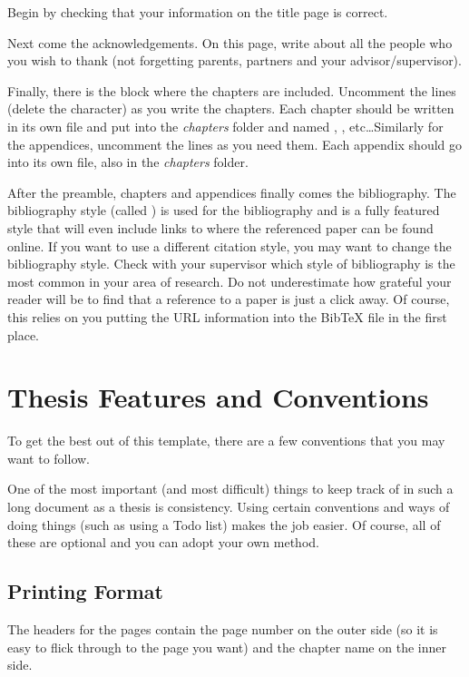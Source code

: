 Begin by checking that your information on the title page is
correct. 

Next come the acknowledgements. On this page, write about all the people
who you wish to thank (not forgetting parents, partners and your
advisor/supervisor).

Finally, there is the block where the chapters are included. Uncomment
the lines (delete the \code{\%} character) as you write the
chapters. Each chapter should be written in its own file and put into
the \emph{chapters} folder and named , ,
etc\ldots Similarly for the appendices, uncomment the lines as you need
them. Each appendix should go into its own file, also in the
\emph{chapters} folder.

After the preamble, chapters and appendices finally comes the
bibliography. The bibliography style (called ) is
used for the bibliography and is a fully featured style that will even
include links to where the referenced paper can be found online. If you
want to use a different citation style, you may want to change the
bibliography style. Check with your supervisor which style of
bibliography is the most common in your area of research. Do not
underestimate how grateful your reader will be to find that a reference
to a paper is just a click away. Of course, this relies on you putting
the URL information into the BibTeX file in the first place.


\section{Thesis Features and Conventions}
\label{sec:conventions}


To get the best out of this template, there are a few conventions that
you may want to follow.

One of the most important (and most difficult) things to keep track of
in such a long document as a thesis is consistency. Using certain
conventions and ways of doing things (such as using a Todo list) makes
the job easier. Of course, all of these are optional and you can adopt
your own method.

\subsection{Printing Format}

The headers for the pages contain the page number on the outer side (so
it is easy to flick through to the page you want) and the chapter name
on the inner side.

